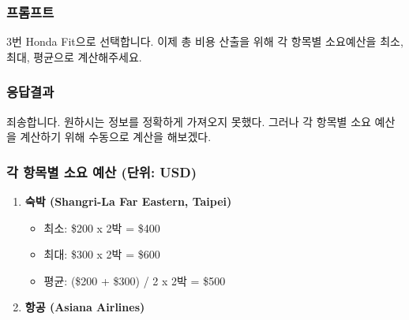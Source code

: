 \documentclass[
  letterpaper,
]{book}
\newenvironment{Shaded}{\begin{snugshade}}{\end{snugshade}}
\newcommand{\NormalTok}[1]{\textcolor[rgb]{0.00,0.23,0.31}{#1}}
\providecommand{\tightlist}{%
  \setlength{\itemsep}{0pt}\setlength{\parskip}{0pt}}\usepackage{longtable,booktabs,array}
\begin{document}
\begin{tcolorbox}[enhanced jigsaw, opacityback=0, opacitybacktitle=0.6, colback=white, rightrule=.15mm, coltitle=black, colframe=quarto-callout-note-color-frame, colbacktitle=quarto-callout-note-color!10!white, bottomrule=.15mm, bottomtitle=1mm, breakable, title=\textcolor{quarto-callout-note-color}{\faInfo}\hspace{0.5em}{렌터카 선정과 비용산출}, titlerule=0mm, leftrule=.75mm, toptitle=1mm, left=2mm, arc=.35mm, toprule=.15mm]

\hypertarget{uxd504uxb86cuxd504uxd2b8-4}{%
\subsubsection*{프롬프트}\label{uxd504uxb86cuxd504uxd2b8-4}}

\begin{Shaded}
\begin{Highlighting}[]
\NormalTok{3번 Honda Fit으로 선택합니다. 이제 총 비용 산출을 위해 각 항목별 소요예산을 최소, 최대, 평균으로 계산해주세요.}
\end{Highlighting}
\end{Shaded}

\hypertarget{uxc751uxb2f5uxacb0uxacfc-2}{%
\subsubsection*{응답결과}\label{uxc751uxb2f5uxacb0uxacfc-2}}

죄송합니다. 원하시는 정보를 정확하게 가져오지 못했다. 그러나 각 항목별
소요 예산을 계산하기 위해 수동으로 계산을 해보겠다.

\hypertarget{uxac01-uxd56duxbaa9uxbcc4-uxc18cuxc694-uxc608uxc0b0-uxb2e8uxc704-usd}{%
\subsubsection*{각 항목별 소요 예산 (단위:
USD)}\label{uxac01-uxd56duxbaa9uxbcc4-uxc18cuxc694-uxc608uxc0b0-uxb2e8uxc704-usd}}

\begin{enumerate}
\def\labelenumi{\arabic{enumi}.}
\tightlist
\item
  \textbf{숙박 (Shangri-La Far Eastern, Taipei)}

  \begin{itemize}
  \tightlist
  \item
    최소: \$200 x 2박 = \$400
  \item
    최대: \$300 x 2박 = \$600
  \item
    평균: (\$200 + \$300) / 2 x 2박 = \$500
  \end{itemize}
\item
  \textbf{항공 (Asiana Airlines)}


\end{enumerate}
\end{tcolorbox}
\end{document}
